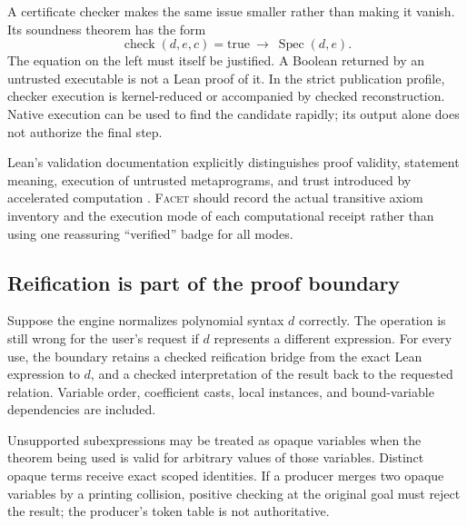 \documentclass[11pt,letterpaper]{article}
\newcommand{\Facet}{\textsc{Facet}}
\newcommand{\Spec}{\operatorname{Spec}}
\numberwithin{equation}{section}
\begin{document}
A certificate checker makes the same issue smaller rather than making it
vanish. Its soundness theorem has the form
\[
 \operatorname{check}(d,e,c)=\mathrm{true}\ \longrightarrow\ \Spec(d,e).
\]
The equation on the left must itself be justified. A Boolean returned by an
untrusted executable is not a Lean proof of it. In the strict publication
profile, checker execution is kernel-reduced or accompanied by checked
reconstruction. Native execution can be used to find the candidate rapidly;
its output alone does not authorize the final step.

Lean's validation documentation explicitly distinguishes proof validity,
statement meaning, execution of untrusted metaprograms, and trust introduced
by accelerated computation \cite{lean-validation}. \Facet{} should record the
actual transitive axiom inventory and the execution mode of each computational
receipt rather than using one reassuring ``verified'' badge for all modes.

\subsection{Reification is part of the proof boundary}
Suppose the engine normalizes polynomial syntax $d$ correctly. The operation is
still wrong for the user's request if $d$ represents a different expression.
For every use, the boundary retains a checked reification bridge from the exact
Lean expression to $d$, and a checked interpretation of the result back to the
requested relation. Variable order, coefficient casts, local instances, and
bound-variable dependencies are included.

Unsupported subexpressions may be treated as opaque variables when the theorem
being used is valid for arbitrary values of those variables. Distinct opaque
terms receive exact scoped identities. If a producer merges two opaque variables
by a printing collision, positive checking at the original goal must reject the
result; the producer's token table is not authoritative.
\end{document}
